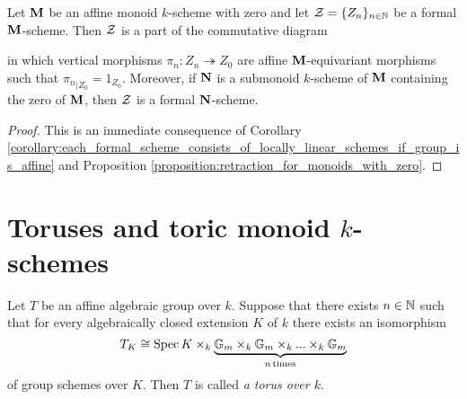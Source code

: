 \begin{corollary}\label{corollary:restraction_for_formal_schemes_and_pointed_submonoids}
Let $\mathbf{M}$ be an affine monoid $k$-scheme with zero and let ${\mathcal Z} = \{Z_n\}_{n\in {\mathbb N}}$ be a formal $\mathbf{M}$-scheme. Then ${\mathcal Z}$ is a part of the commutative diagram
\begin{center}
\end{center}
in which vertical morphisms $\pi_n:Z_n\twoheadrightarrow Z_0$ are affine $\mathbf{M}$-equivariant morphisms such that ${\pi_n}_{\mid Z_0} = 1_{Z_0}$. Moreover, if $\mathbf{N}$ is a submonoid $k$-scheme of $\mathbf{M}$ containing the zero of $\mathbf{M}$, then ${\mathcal Z}$ is a formal $\mathbf{N}$-scheme.
\end{corollary}
\begin{proof}
This is an immediate consequence of Corollary \ref{corollary:each_formal_scheme_consists_of_locally_linear_schemes_if_group_is_affine} and Proposition \ref{proposition:retraction_for_monoids_with_zero}.
\end{proof}

\section{Toruses and toric monoid $k$-schemes}

\begin{definition}
Let $T$ be an affine algebraic group over $k$. Suppose that there exists $n\in {\mathbb N}$ such that for every algebraically closed extension $K$ of $k$ there exists an isomorphism
$$T_K \cong  \mathrm{Spec}\, K \times_k \underbrace{\mathbb{G}_{m}\times_k \mathbb{G}_{m}\times_k ...\times_k \mathbb{G}_{m}}_{n\,\mathrm{times}} $$
of group schemes over $K$. Then $T$ is called \textit{a torus over $k$}.
\end{definition}

